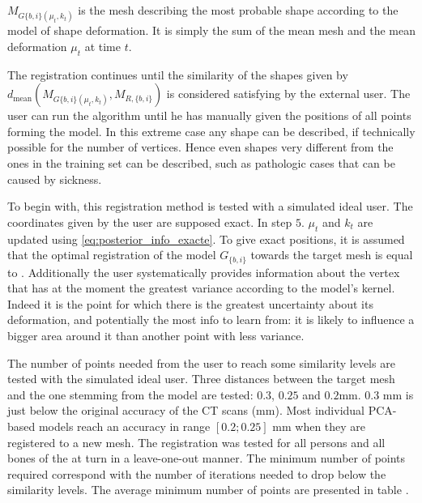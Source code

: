 $M_{G{\{b,i\}}(\mu_t, k_t)}$ is the mesh describing the most probable shape according to the model of shape deformation. It is simply the sum of the mean mesh and the mean deformation $\mu_t$ at time $t$. 


The registration continues until the similarity of the shapes given by $d_\text{mean} (M_{G{\{b,i\}}(\mu_t, k_t)},\allowbreak M_{R,\{b,i\}})$ is considered satisfying by the external user. The user can run the algorithm until he has manually given the positions of all points forming the model. In this extreme case any shape can be described, if technically possible for the number of vertices. Hence even shapes very different from the ones in the training set can be described, such as pathologic cases that can be caused by sickness. 

To begin with, this registration method is tested with a simulated ideal user. The coordinates given by the user are supposed exact. In step $5.$ $\mu_t$ and $k_t$ are updated using \eqref{eq:posterior_info_exacte}. To give exact positions, it is assumed that the optimal registration of the model $G_{\{b,i\}}$ towards the target mesh \mr* is equal to \mw*. Additionally the user systematically provides information about the vertex that has at the moment the greatest variance according to the model's kernel. Indeed it is the point for which there is the greatest uncertainty about its deformation, and potentially the most info to learn from: it is likely to influence a bigger area around it than another point with less variance.

The number of points needed from the user to reach some similarity levels are tested with the simulated ideal user. Three distances between the target mesh and the one stemming from the model are tested: $0.3$, $0.25$ and $0.2$mm. $0.3$ mm is just below the original accuracy of the CT scans (\precision*mm). Most individual PCA-based models reach an accuracy in range $[0.2; 0.25]$ mm when they are registered to a new mesh. The registration was tested for all persons and all bones of the \db* at turn in a leave-one-out manner. The minimum number of points required correspond with the number of iterations needed to drop below the similarity levels. The average minimum number of points are presented in table .



